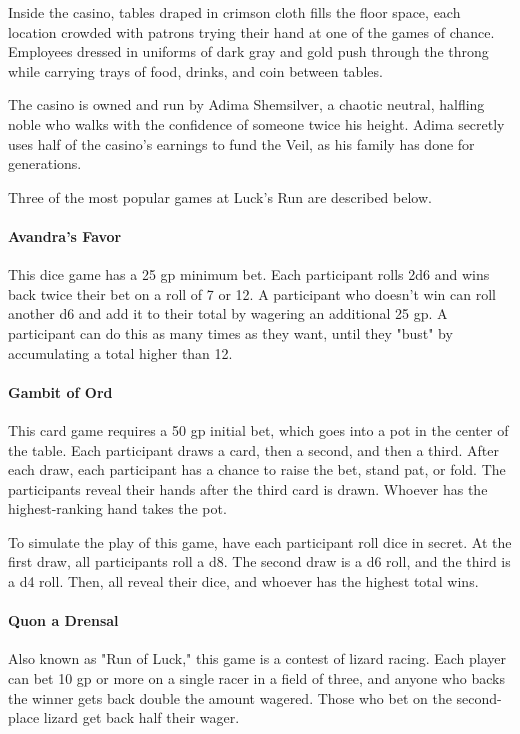 \documentclass[10pt,a4paper,twoside,twocolumn,openany,nodeprecatedcode]{dndbook}
\begin{document}
Inside the casino, tables draped in crimson cloth fills the floor space, each location crowded with patrons trying their hand at one of the games of chance. Employees dressed in uniforms of dark gray and gold push through the throng while carrying trays of food, drinks, and coin between tables.

The casino is owned and run by Adima Shemsilver, a chaotic neutral, halfling noble who walks with the confidence of someone twice his height. Adima secretly uses half of the casino's earnings to fund the Veil, as his family has done for generations.

Three of the most popular games at Luck's Run are described below.

\paragraph{Avandra's Favor}
This dice game has a 25 gp minimum bet. Each participant rolls 2d6 and wins back twice their bet on a roll of 7 or 12. A participant who doesn't win can roll another d6 and add it to their total by wagering an additional 25 gp. A participant can do this as many times as they want, until they "bust" by accumulating a total higher than 12.

\paragraph{Gambit of Ord}
This card game requires a 50 gp initial bet, which goes into a pot in the center of the table. Each participant draws a card, then a second, and then a third. After each draw, each participant has a chance to raise the bet, stand pat, or fold. The participants reveal their hands after the third card is drawn. Whoever has the highest-ranking hand takes the pot.

To simulate the play of this game, have each participant roll dice in secret. At the first draw, all participants roll a d8. The second draw is a d6 roll, and the third is a d4 roll. Then, all reveal their dice, and whoever has the highest total wins.

\paragraph{Quon a Drensal}
Also known as "Run of Luck," this game is a contest of lizard racing. Each player can bet 10 gp or more on a single racer in a field of three, and anyone who backs the winner gets back double the amount wagered. Those who bet on the second-place lizard get back half their wager.
\end{document}
